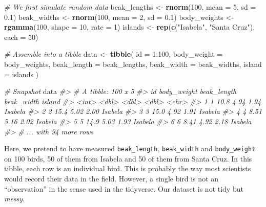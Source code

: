 \documentclass[]{book}
\newenvironment{Shaded}{}{}
\newcommand{\CommentTok}[1]{\textcolor[rgb]{0.38,0.63,0.69}{\textit{#1}}}
\newcommand{\DataTypeTok}[1]{\textcolor[rgb]{0.56,0.13,0.00}{#1}}
\newcommand{\DecValTok}[1]{\textcolor[rgb]{0.25,0.63,0.44}{#1}}
\newcommand{\FloatTok}[1]{\textcolor[rgb]{0.25,0.63,0.44}{#1}}
\newcommand{\KeywordTok}[1]{\textcolor[rgb]{0.00,0.44,0.13}{\textbf{#1}}}
\newcommand{\NormalTok}[1]{#1}
\newcommand{\OperatorTok}[1]{\textcolor[rgb]{0.40,0.40,0.40}{#1}}
\newcommand{\StringTok}[1]{\textcolor[rgb]{0.25,0.44,0.63}{#1}}
\begin{document}
\begin{Shaded}
\begin{Highlighting}[]
\CommentTok{# We first simulate random data}
\NormalTok{beak_lengths <-}\StringTok{ }\KeywordTok{rnorm}\NormalTok{(}\DecValTok{100}\NormalTok{, }\DataTypeTok{mean =} \DecValTok{5}\NormalTok{, }\DataTypeTok{sd =} \FloatTok{0.1}\NormalTok{)}
\NormalTok{beak_widths <-}\StringTok{ }\KeywordTok{rnorm}\NormalTok{(}\DecValTok{100}\NormalTok{, }\DataTypeTok{mean =} \DecValTok{2}\NormalTok{, }\DataTypeTok{sd =} \FloatTok{0.1}\NormalTok{)}
\NormalTok{body_weights <-}\StringTok{ }\KeywordTok{rgamma}\NormalTok{(}\DecValTok{100}\NormalTok{, }\DataTypeTok{shape =} \DecValTok{10}\NormalTok{, }\DataTypeTok{rate =} \DecValTok{1}\NormalTok{)}
\NormalTok{islands <-}\StringTok{ }\KeywordTok{rep}\NormalTok{(}\KeywordTok{c}\NormalTok{(}\StringTok{"Isabela"}\NormalTok{, }\StringTok{"Santa Cruz"}\NormalTok{), }\DataTypeTok{each =} \DecValTok{50}\NormalTok{)}

\CommentTok{# Assemble into a tibble}
\NormalTok{data <-}\StringTok{ }\KeywordTok{tibble}\NormalTok{(}
  \DataTypeTok{id =} \DecValTok{1}\OperatorTok{:}\DecValTok{100}\NormalTok{,}
  \DataTypeTok{body_weight =}\NormalTok{ body_weights,}
  \DataTypeTok{beak_length =}\NormalTok{ beak_lengths,  }
  \DataTypeTok{beak_width =}\NormalTok{ beak_widths,}
  \DataTypeTok{island =}\NormalTok{ islands}
\NormalTok{)}

\CommentTok{# Snapshot}
\NormalTok{data}
\CommentTok{#> # A tibble: 100 x 5}
\CommentTok{#>      id body_weight beak_length beak_width island }
\CommentTok{#>   <int>       <dbl>       <dbl>      <dbl> <chr>  }
\CommentTok{#> 1     1       10.8         4.94       1.94 Isabela}
\CommentTok{#> 2     2       15.4         5.02       2.00 Isabela}
\CommentTok{#> 3     3       15.0         4.92       1.91 Isabela}
\CommentTok{#> 4     4        8.51        5.16       2.02 Isabela}
\CommentTok{#> 5     5       14.9         5.03       1.93 Isabela}
\CommentTok{#> 6     6        8.41        4.92       2.18 Isabela}
\CommentTok{#> # ... with 94 more rows}
\end{Highlighting}
\end{Shaded}

Here, we pretend to have measured \texttt{beak\_length}, \texttt{beak\_width} and \texttt{body\_weight} on 100 birds, 50 of them from Isabela and 50 of them from Santa Cruz. In this tibble, each row is an individual bird. This is probably the way most scientists would record their data in the field. However, a single bird is not an ``observation'' in the sense used in the tidyverse. Our dataset is not tidy but \emph{messy}.
\end{document}
